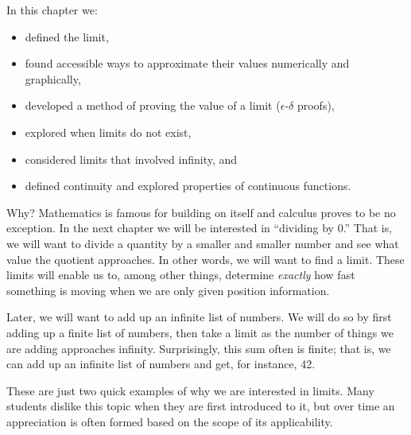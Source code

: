 In this chapter we:
\begin{itemize}
\item defined the limit, 
\item found accessible ways to approximate their values numerically and graphically, 
\item	developed a method of proving the value of a limit ($\epsilon$-$\delta$ proofs),
\item	explored when limits do not exist,
\item	considered limits that involved infinity, and
\item	defined continuity and explored properties of continuous functions.
\end{itemize}

Why? Mathematics is famous for building on itself and calculus proves to be no exception. In the next chapter we will be interested in ``dividing by 0.'' That is, we will want to divide a quantity by a smaller and smaller number and see what value the quotient approaches. In other words, we will want to find a limit. These limits will enable us to, among other things, determine \emph{exactly} how fast something is moving when we are only given position information.

Later, we will want to add up an infinite list of numbers. We will do so by first adding up a finite list of numbers, then take a limit as the number of things we are adding approaches infinity. Surprisingly, this sum often is finite; that is, we can add up an infinite list of numbers and get, for instance, 42.

These are just two quick examples of why we are interested in limits. Many students dislike this topic when they are first introduced to it, but over time an appreciation is often formed based on the scope of its applicability.


